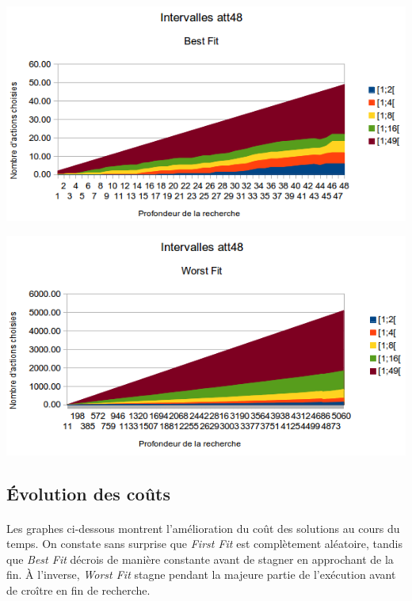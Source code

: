\documentclass[a4paper,10pt]{report}
\begin{document}
\begin{center}
  \includegraphics[width=\textwidth]{images/att48-intervals-best-fit.png}
\end{center}

\begin{center}
  \includegraphics[width=\textwidth]{images/att48-intervals-worst-fit.png}
\end{center}

\subsection{Évolution des coûts}

\paragraph{}
Les graphes ci-dessous montrent l'amélioration du coût des solutions au cours
du temps. On constate sans surprise que \textit{First Fit} est complètement
aléatoire, tandis que \textit{Best Fit} décrois de manière constante avant de
stagner en approchant de la fin. À l'inverse, \textit{Worst Fit} stagne pendant
la majeure partie de l'exécution avant de croître en fin de recherche.
\end{document}
